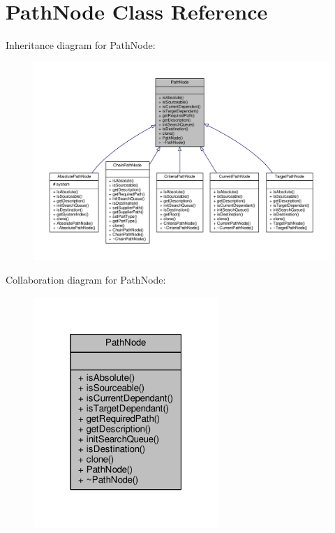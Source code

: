 \hypertarget{classPathNode}{}\section{Path\+Node Class Reference}
\label{classPathNode}


Inheritance diagram for Path\+Node\+:
\nopagebreak
\begin{figure}[H]
\begin{center}
\leavevmode
\includegraphics[width=350pt]{df/d86/classPathNode__inherit__graph}
\end{center}
\end{figure}


Collaboration diagram for Path\+Node\+:
\nopagebreak
\begin{figure}[H]
\begin{center}
\leavevmode
\includegraphics[width=199pt]{d6/d88/classPathNode__coll__graph}
\end{center}
\end{figure}
